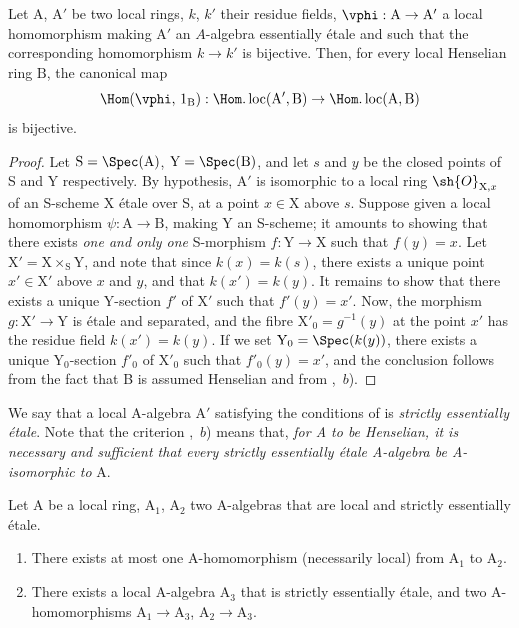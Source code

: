 \begin{lemma}[18.6.2]
\label{IV.18.6.2}
Let $\mathrm{A}$, $\mathrm{A}'$ be two local rings, $k$, $k'$ their residue fields,
$\vphi:\mathrm{A}\to\mathrm{A}'$ a local homomorphism making $\mathrm{A}'$ an $A$-algebra essentially \'{e}tale 
and such that the corresponding homomorphism $k\to k'$ is bijective.
Then, for every local Henselian ring $\mathrm{B}$, the canonical map
\[
  \Hom(\vphi,\,1_{\mathrm{B}}):\Hom.\operatorname{loc}(\mathrm{A}',\mathrm{B})\to\Hom.\operatorname{loc}(\mathrm{A},\mathrm{B})
\]
is bijective.
\end{lemma}

\begin{proof}
Let $\mathrm{S}=\Spec(\mathrm{A})$, $\mathrm{Y}=\Spec(\mathrm{B})$, and let $s$ and $y$ be the closed points of S and Y respectively.
By hypothesis, $\mathrm{A}'$ is isomorphic to a local ring $\sh{O}_{\mathrm{X},x}$ of an S-scheme X \'{e}tale over S, at a point $x\in\mathrm{X}$ above $s$.
Suppose given a local homomorphism $\psi:\mathrm{A}\to\mathrm{B}$, making Y an S-scheme;
it amounts to showing that there exists \emph{one and only one} S-morphism $f:\mathrm{Y}\to\mathrm{X}$ such that $f(y)=x$.
Let $\mathrm{X}'=\mathrm{X}\times_{\mathrm{S}}\mathrm{Y}$, and note that since $k(x)=k(s)$, there exists a unique point $x'\in\mathrm{X}'$ above $x$ and $y$, and that $k(x')=k(y)$.
It remains to show that there exists a unique Y-section $f'$ of $\mathrm{X}'$ such that $f'(y)=x'$.
Now, the morphism $g:\mathrm{X}'\to\mathrm{Y}$ is \'{e}tale and separated, and the fibre $\mathrm{X}'_0=g^{-1}(y)$ at the point $x'$ has the residue field $k(x')=k(y)$.
If we set $\mathrm{Y}_0=\Spec(k(y))$, there exists a unique $\mathrm{Y}_0$-section $f'_0$ of $\mathrm{X}'_0$ such that $f'_0(y)=x'$, and the conclusion follows from the fact that B is assumed Henselian and from ,~$b$).
\end{proof}

We say that a local A-algebra $\mathrm{A}'$ satisfying the conditions of  is \emph{strictly essentially \'{e}tale}.
Note that the criterion ,~$b$) means that, \emph{for A to be Henselian, it is necessary and sufficient that every strictly essentially \'{e}tale A-algebra be A-isomorphic to} A.

\begin{lemma}[18.6.3]
\label{IV.18.6.3}
Let $\mathrm{A}$ be a local ring, $\mathrm{A}_1$, $\mathrm{A}_2$ two A-algebras that are local and strictly essentially \'{e}tale.
\begin{enumerate}[label=\emph{\roman*)}]
  \item There exists at most one A-homomorphism (necessarily local) from $\mathrm{A}_1$ to $\mathrm{A}_2$.
  \item There exists a local A-algebra $\mathrm{A}_3$ that is strictly essentially \'{e}tale, and two A-homomorphisms $\mathrm{A}_1\to\mathrm{A}_3$, $\mathrm{A}_2\to\mathrm{A}_3$.
\end{enumerate}
\end{lemma}

